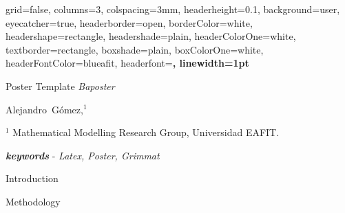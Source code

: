 \documentclass[a0paper,portrait, 25pt]{baposter}
\begin{document}
\begin{poster}{
  grid=false,
  columns=3,
  colspacing=3mm,
  headerheight=0.1\textheight,
  background=user,
  eyecatcher=true,
  headerborder=open,
  borderColor=white,
  headershape=rectangle,
  headershade=plain,
  headerColorOne=white,
  textborder=rectangle,
  boxshade=plain,
  boxColorOne=white,
  headerFontColor=blueafit,
  headerfont=\Large\sf\bf,
  linewidth=1pt
}

{\color{blueafit}
\vspace{0cm}
Poster Template \textit{Baposter}
 \vspace{2cm}
}
{\color{blueafit}\normalsize 
	 \vspace{-2cm}
  \vspace{1em} 
  Alejandro~G\'omez,$^1$

\vspace*{0.3cm}
  \scriptsize{
  	$^1$ Mathematical Modelling Research Group, Universidad EAFIT.
}
}
{ }

\vspace{-1cm}
\begin{posterbox}[name=abstract, span=3 ,column=0,row=0]{}
\lipsum[1]
 \begin{center}
\textbf{\textit{keywords}} - 	\textit{Latex, Poster, Grimmat}
 \end{center}

\end{posterbox}

\begin{posterbox}[name=Introduction,column=0,below=abstract]{Introduction}
\lipsum[2]
\end{posterbox}

\begin{posterbox}[name=Methodology,column=0,below=Introduction]{Methodology}
\lipsum[3]
\end{posterbox}

\begin{posterbox}[name=diagram,span=2, column=0,below=Methodology]{}
\begin{centering}
\end{centering}
\end{posterbox}


\end{poster}
\end{document}
